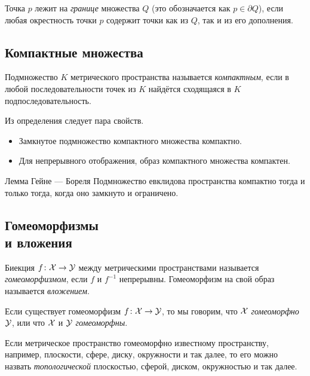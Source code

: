 {Точка $p$ лежит на \emph{границе} множества $Q$ (это обозначается как $p\in\partial Q$), если любая окрестность точки $p$ содержит точки как из $Q$, так и из его дополнения.

\subsection*{Компактные множества}

{\sloppy
Подмножество $K$ метрического пространства называется \emph{компактным}, если в любой последовательности точек из $K$ найдётся сходящаяся в $K$ подпоследовательность.

}

Из определения следует пара свойств.

\begin{itemize}
\item Замкнутое подмножество компактного множества компактно.
\item Для непрерывного отображения, образ компактного множества компактен.
\end{itemize}


{\sloppy

\begin{thm}{Лемма Гейне --- Бореля}\label{thm:Heine--Borel}
Подмножество евклидова пространства компактно тогда и только тогда, когда оно замкнуто и ограничено.
\end{thm}

}

\subsection*{Гомеоморфизмы\\ и вложения}

Биекция $f\colon\mathcal{X}\to\mathcal{Y}$ между метрическими пространствами называется \emph{гомеоморфизмом}, если $f$ и $f^{-1}$ непрерывны.
Гомеоморфизм на свой образ называется \emph{вложением}.

Если существует гомеоморфизм $f\colon\mathcal{X}\to \mathcal{Y}$,
то мы говорим, что ${\mathcal{X}}$ {}\emph{гомеоморфно} $\mathcal{Y}$,
или что $\mathcal{X}$ и $\mathcal{Y}$ {}\emph{гомеоморфны}.

{\sloppy

Если метрическое пространство гомеоморфно известному пространству, например, плоскости, сфере, диску, окружности и так далее,
то его можно назвать \emph{топологической} плоскостью, сферой, диском, окружностью и так далее.

}}
